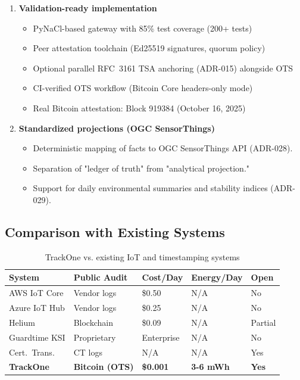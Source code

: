 \begin{enumerate}[nosep]
    \item \textbf{Validation-ready implementation}
    \begin{itemize}[nosep]
        \item PyNaCl-based gateway with 85\% test coverage (200+ tests)
        \item Peer attestation toolchain (Ed25519 signatures, quorum policy)
        \item Optional parallel \ac{RFC}~3161 \ac{TSA} anchoring (\ac{ADR}-015) alongside \ac{OTS}
        \item \ac{CI}-verified \ac{OTS} workflow (Bitcoin Core headers-only mode)
        \item Real Bitcoin attestation: Block 919384 (October 16, 2025)
    \end{itemize}

    \item \textbf{Standardized projections (OGC SensorThings)}
    \begin{itemize}[nosep]
        \item Deterministic mapping of facts to \ac{OGC} SensorThings \ac{API} (\ac{ADR}-028).
        \item Separation of "ledger of truth" from "analytical projection."
        \item Support for daily environmental summaries and stability indices (\ac{ADR}-029).
    \end{itemize}
    \end{enumerate}

    \subsection{Comparison with Existing Systems}\label{subsec:comparison-with-existing-systems}

\begin{table}[H]
    \centering
    \caption{TrackOne vs. existing IoT and timestamping systems}
    \begin{tabularx}{\textwidth}{l X l l l}
    \toprule
    \textbf{System} & \textbf{Public Audit} & \textbf{Cost/Day} & \textbf{Energy/Day} & \textbf{Open} \\
    \midrule
    AWS \ac{IoT} Core & Vendor logs & \$0.50 & N/A & No \\
    Azure \ac{IoT} Hub & Vendor logs & \$0.25 & N/A & No \\
    Helium & Blockchain & \$0.09 & N/A & Partial \\
    Guardtime KSI & Proprietary & Enterprise & N/A & No \\
    Cert.\ Trans.
    & \ac{CT} logs & N/A & N/A & Yes \\
    \textbf{TrackOne} & \textbf{Bitcoin (OTS)} & \textbf{\$0.001} & \textbf{3-6 mWh} & \textbf{Yes} \\
    \bottomrule
    \end{tabularx}\label{tab:table}
    \end{table}

